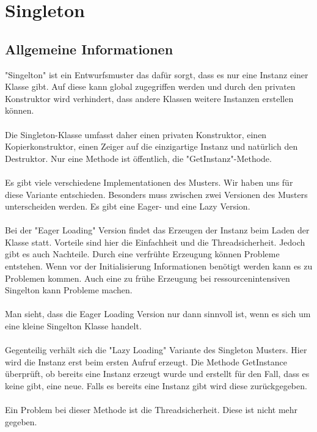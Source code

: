 \chapter{Singleton}

\section{Allgemeine Informationen}

"Singelton" ist ein Entwurfsmuster das dafür sorgt, dass es nur eine Instanz einer Klasse gibt. Auf diese kann global zugegriffen werden und durch den privaten Konstruktor wird verhindert, dass andere Klassen weitere Instanzen erstellen können.
\\
\\
Die Singleton-Klasse umfasst daher einen privaten Konstruktor, einen Kopierkonstruktor, einen Zeiger auf die einzigartige Instanz und natürlich den Destruktor. Nur eine Methode ist öffentlich, die "GetInstanz"-Methode.
\\
\\
Es gibt viele verschiedene Implementationen des Musters. Wir haben uns für diese Variante entschieden. Besonders muss zwischen zwei Versionen des Musters unterscheiden werden. Es gibt eine Eager- und eine Lazy Version.
\\
\\
Bei der "Eager Loading" Version findet das Erzeugen der Instanz beim Laden der Klasse statt. Vorteile sind hier die Einfachheit und die Threadsicherheit. Jedoch gibt es auch Nachteile. Durch eine verfrühte Erzeugung können Probleme entstehen. Wenn vor der Initialisierung Informationen benötigt werden kann es zu Problemen kommen. Auch eine zu frühe Erzeugung bei ressourcenintensiven Singelton kann Probleme machen.
\\
\\
Man sieht, dass die Eager Loading Version nur dann sinnvoll ist, wenn es sich um eine kleine Singelton Klasse handelt.
\\
\\
Gegenteilig verhält sich die "Lazy Loading" Variante des Singleton Musters. Hier wird die Instanz erst beim ersten Aufruf erzeugt. Die Methode GetInstance überprüft, ob bereits eine Instanz erzeugt wurde und erstellt für den Fall, dass es keine gibt, eine neue. Falls es bereits eine Instanz gibt wird diese zurückgegeben.
\\
\\
Ein Problem bei dieser Methode ist die Threadsicherheit. Diese ist nicht mehr gegeben. \\

